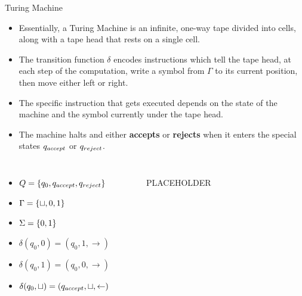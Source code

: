 \documentclass[c]{beamer}
\begin{document}
\begin{frame}{Turing Machine}

  \begin{itemize}
  \item Essentially, a Turing Machine is an infinite, one-way tape
    divided into cells, along with a tape head that rests on a
    single cell. \pause  
  \item The transition function $\delta$ encodes instructions
    which tell the tape head, at each step of the computation,
    write a symbol from $\Gamma$ to its current position, then
    move either left or right. \pause
  \item The specific instruction that gets executed depends on the
    state of the machine and the symbol currently under the tape
    head.\pause
  \item The machine halts and either \textbf{accepts} or
    \textbf{rejects} when it enters the special states $q_{accept}$ or
    $q_{reject}$.

  \end{itemize}
\end{frame}

\begin{frame}
  \begin{columns}[c]
    
    \small

    \column{2in}

    \begin{itemize}
    \item $Q = \{q_0, q_{accept}, q_{reject}\}$
    \item $\Gamma = \{\sqcup, 0, 1\}$
    \item $\Sigma = \{0,1\}$
    \item $\delta(q_0, 0) = (q_0, 1, \rightarrow)$
    \item $\delta(q_0, 1) = (q_0, 0, \rightarrow)$
    \item $\delta(q_0, \sqcup) = (q_{accept}, \sqcup, \leftarrow)$
    \end{itemize}

    \column{2in}
    
    \begin{figure}[p]
      
      PLACEHOLDER
      
    \end{figure}
    
  \end{columns}
\end{frame}
\end{document}

